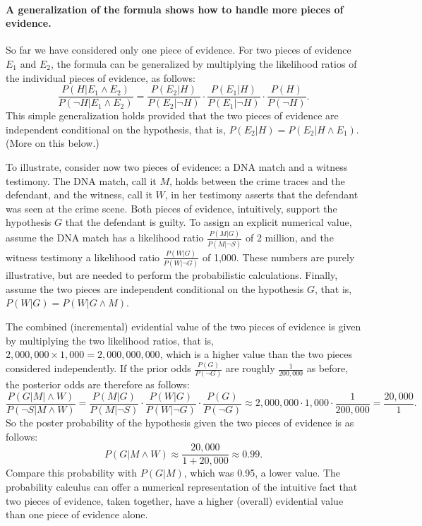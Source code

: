 \documentclass[10pt]{article}
\begin{document}
\paragraph{A generalization of the formula shows how to handle more pieces of evidence.} 
So far we have considered only one piece of evidence. 
For two pieces of evidence $E_1$ and $E_2$, the formula can be generalized 
by multiplying the likelihood ratios of the individual pieces of evidence, as follows:
	\[ \frac{P(H|E_1 \land E_2)}{P(\neg H | E_1 \land E_2)} = 
	\frac{P(E_2 | H)}{P(E_2| \neg H)}
	\cdot 
	\frac{P(E_1 | H)}{P(E_1| \neg H)}
	\cdot 
	\frac{P(H)}{P(\neg H)}.\]
This simple generalization holds provided that the two pieces of evidence are 
independent conditional on the hypothesis, that is, $P(E_2| H)=P(E_2| H \wedge E_1)$. 
(More on this below.) 

To illustrate, consider now two pieces of evidence: a DNA match and a witness testimony.
The DNA match, call it $M$, holds between the crime traces and the defendant, and 
the witness, call it $W$, in her testimony asserts that the defendant was 
seen at the crime scene.  
Both pieces of evidence, intuitively, support the hypothesis $G$ that the defendant 
is guilty. To assign an explicit numerical value, assume
 the DNA match has a likelihood ratio $\frac{P(M | G)}{P( M | \neg S)}$ of 2 million, 
and the witness testimony a likelihood ratio $\frac{P(W | G)}{P( W | \neg G)}$ of 1,000. 
These numbers are purely illustrative, but are needed to perform the probabilistic calculations.  Finally, assume the two pieces are independent conditional on the hypothesis $G$, that is, 
$P(W|G)=P(W| G\wedge M)$. 

The combined (incremental) evidential value of the two pieces of evidence is given by multiplying the two likelihood 
ratios, that is, $2,000,000\times 1,000=2,000,000,000$, which is a higher value 
than the two pieces considered independently. 
If the prior odds $\frac{P(G)}{P(\neg G)}$ are roughly $\frac{1}{200,000}$
as before, the posterior odds are therefore as follows:
%
\[\frac{P(G|M|\wedge W)}{P(\neg S|M\wedge W)}= \frac{P(M |G)}{P( M | \neg S)}\cdot  \frac{P(W |G)}{P( W | \neg G)}\cdot \frac{P(G)}{P(\neg G)} \approx 2,000,000 \cdot  1,000 \cdot \frac{1}{200,000}= \frac{20,000}{1}.\]
% 
So the poster probability of the hypothesis given the two pieces of evidence is as follows:
%
\[P(G|M\wedge W) \approx \frac{20,000}{1+20,000}\approx 0.99.\]
%
Compare this probability with $P(G|M)$, which 
was 0.95, a lower value. The probability calculus can offer a numerical 
representation of the intuitive fact that two pieces of evidence, taken together, 
have a higher (overall) evidential value than one piece of evidence alone. 
\end{document}
